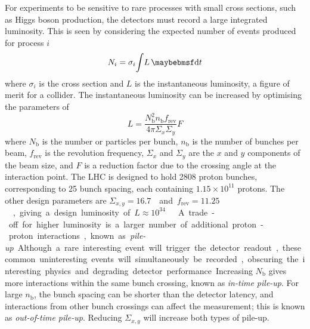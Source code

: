 For experiments to be sensitive to rare processes with small cross sections, such as Higgs 
boson production, the detectors must record a large integrated luminosity. This is seen by 
considering the expected number of events produced for process $i$
\begin{equation}
	N_i = \sigma_i \! \int \! L \, \d{t}
	\label{eq:event_rate}
\end{equation}
where $\sigma_i$ is the cross section and $L$ is the instantaneous luminosity, a figure of 
merit for a collider. The instantaneous luminosity can be increased by optimising the
parameters of
\begin{equation}
	L = \frac{N_{\text{b}}^2 n_{\text{b}} f_{\text{rev}}}{4\pi \varSigma_x \varSigma_y} F
	\label{eq:lumi_beam}
\end{equation}
where $N_{\text{b}}$ is the number or particles per bunch, $n_{\text{b}}$ is the number of 
bunches per beam, $f_{\text{rev}}$ is the revolution frequency, $\varSigma_x$ and 
$\varSigma_y$ are the $x$ and $y$ components of the beam size, and $F$ is a reduction 
factor due to the crossing angle at the interaction point. The LHC is designed to 
hold 2808 proton bunches, corresponding to \unit{25}{\nano\second} bunch spacing, each 
containing $1.15\times10^{11}$ protons. The other design parameters are 
\unit{$\varSigma_{x,y} = 16.7$}{\micro\metre} and \unit{$f_{\text{rev}} = 11.25$}{\kHz}, 
giving a design luminosity of \unit{$L \approx 10^{34}$}{\lumiunits} \cite{LHC}.

A trade-off for higher luminosity is a larger number of additional proton-proton 
interactions, known as \textit{pile-up}. Although a rare interesting event will trigger 
the detector readout, these common uninteresting events will simultaneously be recorded, 
obscuring the interesting physics and degrading detector performance. Increasing 
$N_{\text{b}}$ gives more interactions within the same bunch crossing, known as 
\textit{in-time pile-up}. For large $n_{\text{b}}$, the bunch spacing can be shorter than 
the detector latency, and interactions from other bunch crossings can affect the 
measurement; this is known as \textit{out-of-time pile-up}. Reducing $\varSigma_{x,y}$ 
will increase both types of pile-up.
